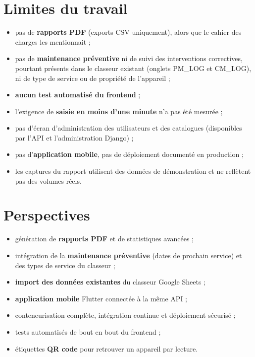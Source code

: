 \section{Limites du travail}

\begin{itemize}
  \item pas de \textbf{rapports PDF} (exports CSV uniquement), alors que le cahier des charges les mentionnait ;
  \item pas de \textbf{maintenance préventive} ni de suivi des interventions correctives, pourtant présents dans le classeur existant (onglets PM\_\allowbreak{}LOG et CM\_\allowbreak{}LOG), ni de type de service ou de propriété de l'appareil ;
  \item \textbf{aucun test automatisé du frontend} ;
  \item l'exigence de \textbf{saisie en moins d'une minute} n'a pas été mesurée ;
  \item pas d'écran d'administration des utilisateurs et des catalogues (disponibles par l'API et l'administration Django) ;
  \item pas d'\textbf{application mobile}, pas de déploiement documenté en production ;
  \item les captures du rapport utilisent des données de démonstration et ne reflètent pas des volumes réels.
\end{itemize}

\section{Perspectives}

\begin{itemize}
  \item génération de \textbf{rapports PDF} et de statistiques avancées ;
  \item intégration de la \textbf{maintenance préventive} (dates de prochain service) et des types de service du classeur ;
  \item \textbf{import des données existantes} du classeur Google Sheets ;
  \item \textbf{application mobile} Flutter connectée à la même API ;
  \item conteneurisation complète, intégration continue et déploiement sécurisé ;
  \item tests automatisés de bout en bout du frontend ;
  \item étiquettes \textbf{QR code} pour retrouver un appareil par lecture.
\end{itemize}

